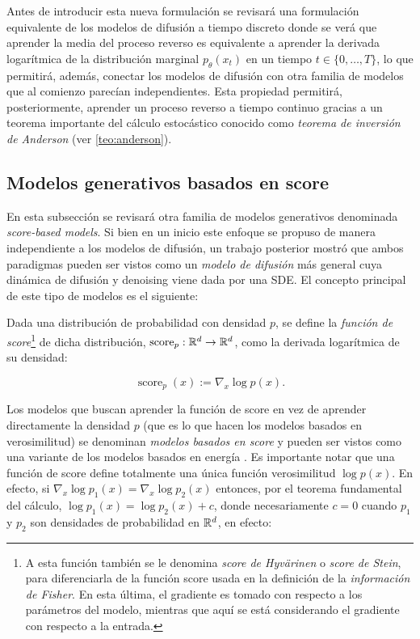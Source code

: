 Antes de introducir esta nueva formulación se revisará una formulación equivalente de los modelos de difusión a tiempo discreto donde se verá que aprender la media del proceso reverso es equivalente a aprender la derivada logarítmica de la distribución marginal $p_\theta(x_t)$ en un tiempo $t\in\{0,\ldots,T\}$, lo que permitirá, además, conectar los modelos de difusión con otra familia de modelos que al comienzo parecían independientes. Esta propiedad permitirá, posteriormente, aprender un proceso reverso a tiempo continuo gracias a un teorema importante del cálculo estocástico conocido como \textit{teorema de inversión de Anderson} (ver \autoref{teo:anderson}).

\subsection{Modelos generativos basados en score}
\label{dm/continuous_dm/score}

En esta subsección se revisará otra familia de modelos generativos denominada \textit{score-based models}. Si bien en un inicio este enfoque se propuso de manera independiente a los modelos de difusión, un trabajo posterior mostró que ambos paradigmas pueden ser vistos como un \textit{modelo de difusión} más general cuya dinámica de difusión y denoising viene dada por una SDE. El concepto principal de este tipo de modelos es el siguiente:

\begin{defn}
    \label{defn:score}
    Dada una distribución de probabilidad con densidad $p$, se define la \textit{función de score}\footnote{A esta función también se le denomina \textit{score de Hyvärinen} o \textit{score de Stein}, para diferenciarla de la función score usada en la definición de la \textit{información de Fisher}. En esta última, el gradiente es tomado con respecto a los parámetros del modelo, mientras que aquí se está considerando el gradiente con respecto a la entrada.} de dicha distribución, $\operatorname{score}_p:\mathbb{R}^d\to\mathbb{R}^d$, como la derivada logarítmica de su densidad:

\begin{equation*}
    \operatorname{score}_p(x) := \nabla_x \log p(x).
\end{equation*}
\end{defn}

Los modelos que buscan aprender la función de score en vez de aprender directamente la densidad $p$ (que es lo que hacen los modelos basados en verosimilitud) se denominan \textit{modelos basados en score} y pueden ser vistos como una variante de los modelos basados en energía \cite{song2021trainenergybasedmodels}. Es importante notar que una función de score define totalmente una única función verosimilitud $\log p(x)$. En efecto, si $\nabla_x \log p_1(x) = \nabla_x \log p_2(x)$ entonces, por el teorema fundamental del cálculo, $\log p_1(x) = \log p_2(x)+c$, donde necesariamente $c=0$ cuando $p_1$ y $p_2$ son densidades de probabilidad en $\mathbb{R}^d$, en efecto:

